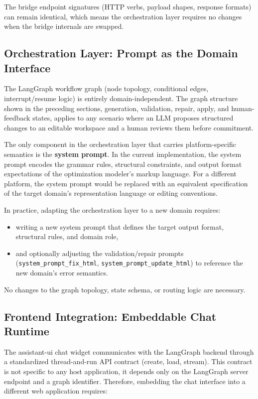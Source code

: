 The bridge endpoint signatures (HTTP verbs, payload shapes, response formats) can remain identical, which means the orchestration layer requires no changes when the bridge internals are swapped.

\subsection{Orchestration Layer: Prompt as the Domain Interface}
The LangGraph workflow graph (node topology, conditional edges, interrupt/resume logic) is entirely domain-independent. The graph structure shown in the preceding sections,  generation, validation, repair, apply, and human-feedback states, applies to any scenario where an LLM proposes structured changes to an editable workspace and a human reviews them before commitment.

The only component in the orchestration layer that carries platform-specific semantics is the \textbf{system prompt}. In the current implementation, the system prompt encodes the grammar rules, structural constraints, and output format expectations of the optimization modeler's markup language. For a different platform, the system prompt would be replaced with an equivalent specification of the target domain's representation language or editing conventions.

In practice, adapting the orchestration layer to a new domain requires:
\begin{itemize}
    \item writing a new system prompt that defines the target output format, structural rules, and domain role,
    \item and optionally adjusting the validation/repair prompts (\texttt{system\_prompt\_fix\_html}, \texttt{system\_prompt\_update\_html}) to reference the new domain's error semantics.
\end{itemize}

No changes to the graph topology, state schema, or routing logic are necessary.

\subsection{Frontend Integration: Embeddable Chat Runtime}
The assistant-ui chat widget communicates with the LangGraph backend through a standardized thread-and-run API contract (create, load, stream). This contract is not specific to any host application, it depends only on the LangGraph server endpoint and a graph identifier. Therefore, embedding the chat interface into a different web application requires:

